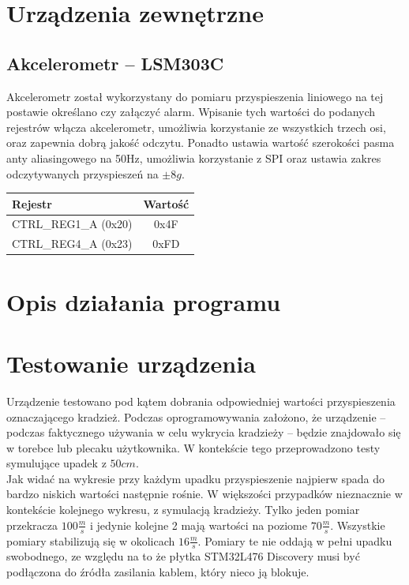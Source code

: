 \documentclass[10pt, a4paper]{article}
\begin{document}
\section{Urządzenia zewnętrzne}
\subsection{Akcelerometr -- LSM303C}
Akcelerometr został wykorzystany do pomiaru przyspieszenia liniowego na tej postawie określano czy załączyć alarm. Wpisanie tych wartości do podanych rejestrów włącza akcelerometr, umożliwia korzystanie ze wszystkich trzech osi, oraz zapewnia dobrą jakość odczytu. Ponadto ustawia wartość szerokości pasma anty aliasingowego na 50Hz, umożliwia korzystanie z SPI oraz ustawia zakres odczytywanych przyspieszeń na $\pm 8g$. \cite{man}
\begin{table}[H]
\centering
\begin{tabular}{|l|c|}
\hline 
\textbf{Rejestr} &\textbf{Wartość} \\ \hline \hline
CTRL\_REG1\_A (0x20) & 0x4F \\ \hline
CTRL\_REG4\_A (0x23) & 0xFD \\ \hline


\end{tabular}
\end{table}

\section{Opis działania programu}

\section{Testowanie urządzenia}
Urządzenie testowano pod kątem dobrania odpowiedniej wartości przyspieszenia oznaczającego kradzież. Podczas oprogramowywania założono, że urządzenie -- podczas faktycznego używania w celu wykrycia kradzieży -- będzie znajdowało się w torebce lub plecaku użytkownika. W kontekście tego przeprowadzono testy symulujące upadek z $50cm$. \\ 
Jak widać na wykresie przy każdym upadku przyspieszenie najpierw spada do bardzo niskich wartości następnie rośnie. W większości przypadków nieznacznie w kontekście kolejnego wykresu, z symulacją kradzieży. Tylko jeden pomiar przekracza $100 \frac{m}{s}$ i jedynie kolejne 2 mają wartości na poziome $70 \frac{m}{s}$. Wszystkie pomiary stabilizują się w okolicach $16 \frac{m}{s}$. Pomiary te nie oddają w pełni upadku swobodnego, ze względu na to że płytka STM32L476 Discovery musi być podłączona do źródła zasilania kablem, który nieco ją blokuje.
\end{document}

